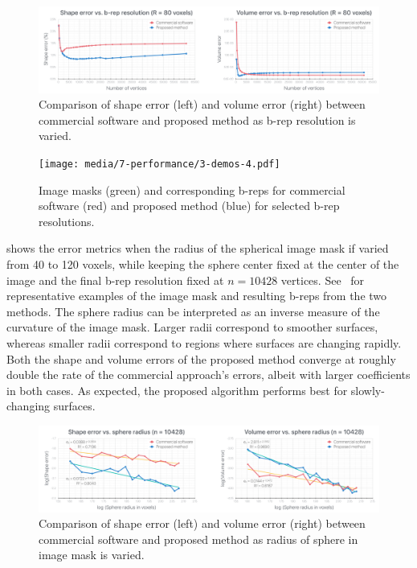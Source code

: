 \begin{figure}[ht!]
	\centering
	\includegraphics[scale=0.25]{media/7-performance/1-graph-1.pdf}
	\caption{Comparison of shape error (left) and volume error (right) between commercial software and proposed method as b-rep resolution is varied.}
	\label{fig:graph1}
\end{figure}
\begin{figure}[ht!]
	\centering
	\texttt{[image: media/7-performance/3-demos-4.pdf]}
	\caption{Image masks (green) and corresponding b-reps for commercial software (red) and proposed method (blue) for selected b-rep resolutions.}
	\label{fig:demos1}
\end{figure}
%
 shows the error metrics when the radius of the spherical image mask if varied from 40 to 120 voxels, while keeping the sphere center fixed at the center of the image and the final b-rep resolution fixed at $n = 10428$ vertices. See~ for representative examples of the image mask and resulting b-reps from the two methods. The sphere radius can be interpreted as an inverse measure of the curvature of the image mask. Larger radii correspond to smoother surfaces, whereas smaller radii correspond to regions where surfaces are changing rapidly. Both the shape and volume errors of the proposed method converge at roughly double the rate of the commercial approach's errors, albeit with larger coefficients in both cases. As expected, the proposed algorithm performs best for slowly-changing surfaces.
\begin{figure}[ht!]
	\centering
	\includegraphics[scale=0.25]{media/7-performance/1-graph-2.pdf}
	\caption{Comparison of shape error (left) and volume error (right) between commercial software and proposed method as radius of sphere in image mask is varied.}
	\label{fig:graph2}
\end{figure}
